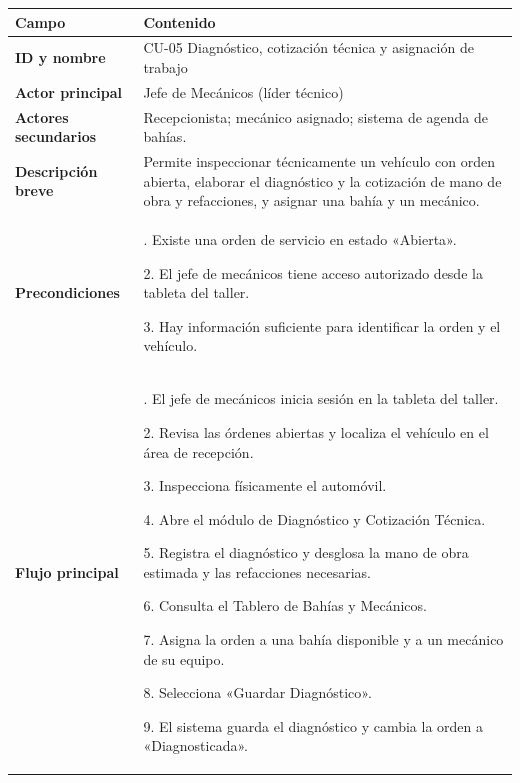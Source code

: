 {\def\LTcaptype{none} %
\begin{longtable}[]{@{}
  >{\raggedright\arraybackslash}p{}
  >{\raggedright\arraybackslash}p{}@{}}
\toprule\noalign{}
\begin{minipage}[b]{\linewidth}\raggedright
\textbf{Campo}
\end{minipage} & \begin{minipage}[b]{\linewidth}\raggedright
\textbf{Contenido}
\end{minipage} \\
\midrule\noalign{}
\endhead
\bottomrule\noalign{}
\endlastfoot
\textbf{ID y nombre} & CU-05 Diagnóstico, cotización técnica y
asignación de trabajo \\
\textbf{Actor principal} & Jefe de Mecánicos (líder técnico) \\
\textbf{Actores secundarios} & Recepcionista; mecánico asignado; sistema
de agenda de bahías. \\
\textbf{Descripción breve} & Permite inspeccionar técnicamente un
vehículo con orden abierta, elaborar el diagnóstico y la cotización de
mano de obra y refacciones, y asignar una bahía y un mecánico. \\
\textbf{Precondiciones} & 1. Existe una orden de servicio en estado
«Abierta».

2. El jefe de mecánicos tiene acceso autorizado desde la tableta del
taller.

3. Hay información suficiente para identificar la orden y el
vehículo. \\
\textbf{Flujo principal} & 1. El jefe de mecánicos inicia sesión en la
tableta del taller.

2. Revisa las órdenes abiertas y localiza el vehículo en el área de
recepción.

3. Inspecciona físicamente el automóvil.

4. Abre el módulo de Diagnóstico y Cotización Técnica.

5. Registra el diagnóstico y desglosa la mano de obra estimada y las
refacciones necesarias.

6. Consulta el Tablero de Bahías y Mecánicos.

7. Asigna la orden a una bahía disponible y a un mecánico de su equipo.

8. Selecciona «Guardar Diagnóstico».

9. El sistema guarda el diagnóstico y cambia la orden a «Diagnosticada».


\end{longtable}}
